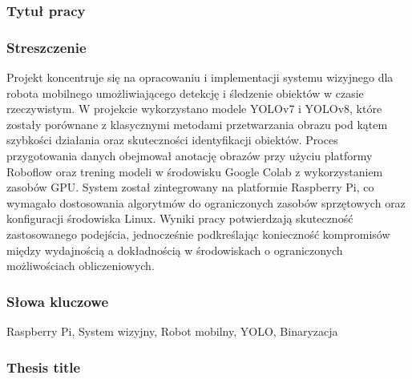 \documentclass[a4paper,twoside,12pt]{book}
\begin{document}


\cleardoublepage

\rmfamily\normalfont
\pagestyle{empty}



\subsubsection*{Tytuł pracy} 
\Title

\subsubsection*{Streszczenie}  

Projekt koncentruje się na opracowaniu i implementacji systemu wizyjnego dla robota mobilnego umożliwiającego detekcję i śledzenie obiektów w czasie rzeczywistym. W projekcie wykorzystano modele YOLOv7 i YOLOv8, które zostały porównane z klasycznymi metodami przetwarzania obrazu pod kątem szybkości działania oraz skuteczności identyfikacji obiektów. Proces przygotowania danych obejmował anotację obrazów przy użyciu platformy Roboflow oraz trening modeli w środowisku Google Colab z wykorzystaniem zasobów GPU.
System został zintegrowany na platformie Raspberry Pi, co wymagało dostosowania algorytmów do ograniczonych zasobów sprzętowych oraz konfiguracji środowiska Linux.
Wyniki pracy potwierdzają skuteczność zastosowanego podejścia, jednocześnie podkreślając konieczność kompromisów między wydajnością a dokładnością w środowiskach o ograniczonych możliwościach obliczeniowych.


\subsubsection*{Słowa kluczowe} 
Raspberry Pi, System wizyjny, Robot mobilny, YOLO, Binaryzacja

\subsubsection*{Thesis title} 
\begin{otherlanguage}{british}
\TitleAlt
\end{otherlanguage}
\end{document}
